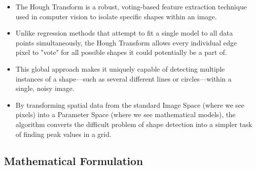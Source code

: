 \documentclass[12pt]{article}
\begin{document}
\begin{itemize}
    \item The Hough Transform is a robust, voting-based feature extraction technique used in computer vision to isolate specific shapes within an image.

    \item Unlike regression methods that attempt to fit a single model to all data points simultaneously, the Hough Transform allows every individual edge pixel to "vote" for all possible shapes it could potentially be a part of.

    \item This global approach makes it uniquely capable of detecting multiple instances of a shape—such as several different lines or circles—within a single, noisy image.

    \item By transforming spatial data from the standard Image Space (where we see pixels) into a Parameter Space (where we see mathematical models), the algorithm converts the difficult problem of shape detection into a simpler task of finding peak values in a grid.
\end{itemize}


\subsection{Mathematical Formulation}
\end{document}
